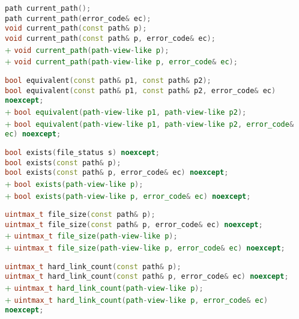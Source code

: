 \documentclass[11pt]{article}
\newcommand{\code}[2][cpp]{\lstinline[language=#1,basicstyle=\small\ttfamily]{#2}}
\newcommand{\tsreplace}[3]{\textcolor{red}{\sout{#1}}#2\textcolor{darkgreen}{#3}}
\begin{document}
\tsreplace{}{  \code{path current_path();}}{}\\
\tsreplace{}{  \code{path current_path(error_code& ec);}}{}\\
\tsreplace{}{  \code{void current_path(const path& p);}}{}\\
\tsreplace{}{  \code{void current_path(const path& p, error_code& ec);}}{}\\
\tsreplace{}{}{+ \code{void current_path(path-view-like p);}}\\
\tsreplace{}{}{+ \code{void current_path(path-view-like p, error_code& ec);}}

\tsreplace{}{  \code{bool equivalent(const path& p1, const path& p2);}}{}\\
\tsreplace{}{  \code{bool equivalent(const path& p1, const path& p2, error_code& ec) noexcept;}}{}\\
\tsreplace{}{}{+ \code{bool equivalent(path-view-like p1, path-view-like p2);}}\\
\tsreplace{}{}{+ \code{bool equivalent(path-view-like p1, path-view-like p2, error_code& ec) noexcept;}}

\tsreplace{}{  \code{bool exists(file_status s) noexcept;}}{}\\
\tsreplace{}{  \code{bool exists(const path& p);}}{}\\
\tsreplace{}{  \code{bool exists(const path& p, error_code& ec) noexcept;}}{}\\
\tsreplace{}{}{+ \code{bool exists(path-view-like p);}}\\
\tsreplace{}{}{+ \code{bool exists(path-view-like p, error_code& ec) noexcept;}}

\tsreplace{}{  \code{uintmax_t file_size(const path& p);}}{}\\
\tsreplace{}{  \code{uintmax_t file_size(const path& p, error_code& ec) noexcept;}}{}\\
\tsreplace{}{}{+ \code{uintmax_t file_size(path-view-like p);}}\\
\tsreplace{}{}{+ \code{uintmax_t file_size(path-view-like p, error_code& ec) noexcept;}}

\tsreplace{}{  \code{uintmax_t hard_link_count(const path& p);}}{}\\
\tsreplace{}{  \code{uintmax_t hard_link_count(const path& p, error_code& ec) noexcept;}}{}\\
\tsreplace{}{}{+ \code{uintmax_t hard_link_count(path-view-like p);}}\\
\tsreplace{}{}{+ \code{uintmax_t hard_link_count(path-view-like p, error_code& ec) noexcept;}}
\end{document}
